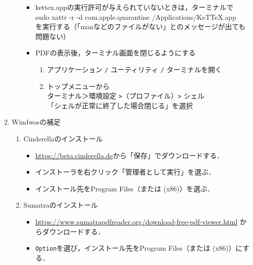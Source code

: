\documentclass{ujarticle}
\begin{document}
\begin{enumerate}[\bf\large 1.]
\begin{enumerate}[(1)]
\begin{itemize}
\item kettex.appの実行許可が与えられていないときは，ターミナルで\\
\hspace*{5mm}sudo xattr -r -d com.apple.quarantine    /Applications/KeTTeX.app\\
を実行する（「manなどのファイルがない」とのメッセージが出ても問題ない）
%
    \item PDFの表示後，ターミナル画面を閉じるようにする
       \begin{enumerate}[(1)]
        \item アプリケーション \verb|/| ユーティリティ \verb|/| ターミナルを開く
        \item トップメニューから\\
          \hspace*{5mm}ターミナル＞環境設定 \verb|>|（プロファイル）\verb|>| シェル\\
          \hspace*{10mm}「シェルが正常に終了した場合閉じる」を選択
        \end{enumerate}
\end{itemize}

\end{enumerate}

\newpage

\item Windwosの補足

\begin{enumerate}[(1)]
\item Cinderellaのインストール
\begin{itemize}
\item \url{https://beta.cinderella.de}から「保存」でダウンロードする．
\item インストーラを右クリック「管理者として実行」を選ぶ．
\item インストール先をProgram Files（または (x86)）を選ぶ．
\end{itemize}

\item Sumatraのインストール
\begin{itemize}
\item \url{https://www.sumatrapdfreader.org/download-free-pdf-viewer.html} からダウンロードする．
\item {\color{red}\verb|Option|を選び}，インストール先をProgram Files（または (x86)）にする．
\end{itemize}


\end{enumerate}
\end{enumerate}
\end{document}
